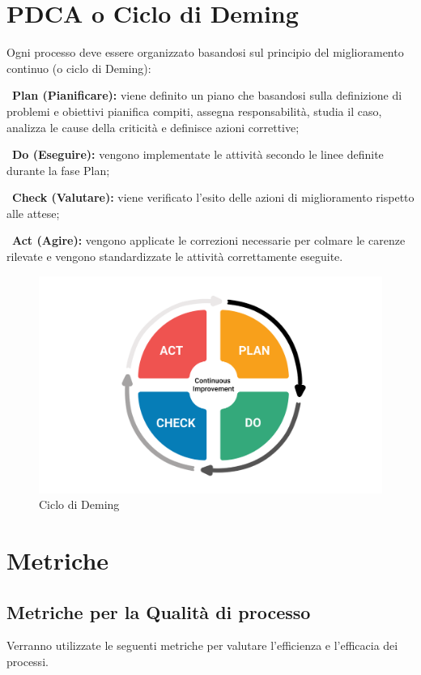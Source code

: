 \section{PDCA o Ciclo di Deming}
\label{A}
Ogni processo deve essere organizzato basandosi sul principio del miglioramento continuo (o ciclo di Deming\pedice):

~\newline\textbf{Plan (Pianificare):} viene definito un piano che basandosi sulla definizione di problemi e obiettivi pianifica compiti, assegna responsabilità, studia il caso, analizza le cause della criticità e definisce azioni correttive;

~\newline\textbf{Do (Eseguire):} vengono implementate le attività secondo le linee definite durante la fase Plan;

~\newline\textbf{Check (Valutare):} viene verificato l’esito delle azioni di miglioramento rispetto alle attese;

~\newline\textbf{Act (Agire):} vengono applicate le correzioni necessarie per colmare le carenze rilevate e vengono standardizzate le attività correttamente eseguite.

\begin{figure}[!htbp]
	\centering
	\includegraphics[scale=0.3]{pdca.png}
	\caption{Ciclo di Deming}
\end{figure}

\section{Metriche}
\label{B}
\subsection{Metriche per la Qualità di processo}
	Verranno  utilizzate  le  seguenti  metriche  per  valutare  l’efficienza  e  l’efficacia  dei processi.
